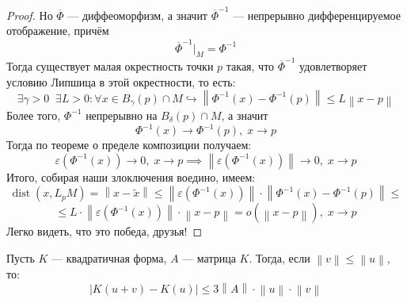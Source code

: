 \documentclass[11pt]{article}
\DeclareMathOperator{\dist}{dist}
\begin{document}
\begin{proof}
    Но $\overline{\Phi}$ --- диффеоморфизм, а значит $\overline{\Phi}^{-1}$ --- непрерывно дифференцируемое отображение, причём 
    \[\overline{\Phi}^{-1} \Big|_{M} = \Phi^{-1}\]
    Тогда существует малая окрестность точки $p$ такая, что $\overline{\Phi}^{-1}$ удовлетворяет условию Липшица в этой окрестности, то есть:
    \[\exists \gamma > 0 \; \; \exists L > 0: \forall x \in B_{\gamma} (p) \cap M \hookrightarrow \left\lVert \Phi^{-1} (x) - \Phi^{-1} (p) \right\rVert \leq L \left\lVert x - p \right\rVert \]
    Более того, $\Phi^{-1}$ непрерывно на $B_{\delta} (p) \cap M$, а значит 
    \[\Phi^{-1} (x) \to \Phi^{-1} (p), \; x \to p\]
    Тогда по теореме о пределе композиции получаем:
    \[\varepsilon (\Phi^{-1} (x)) \to 0, \; x \to p \implies \left\lVert \varepsilon (\Phi^{-1} (x)) \right\rVert \to 0, \; x \to p\]
    Итого, собирая наши злоключения воедино, имеем:
    \[\dist (x, L_p M) = \left\lVert x - \widetilde{x} \right\rVert \leq \left\lVert \varepsilon(\Phi^{-1} (x)) \right\rVert \cdot \left\lVert \Phi^{-1} (x) - \Phi^{-1} (p) \right\rVert \leq\]
    \[\leq L \cdot \left\lVert \varepsilon(\Phi^{-1} (x)) \right\rVert \cdot \left\lVert x - p \right\rVert = o \left(\left\lVert x - p \right\rVert \right), \; x \to p\]
    Легко видеть, что это победа, друзья!
\end{proof}

\begin{lemma} \label{lemma:1.3}
    Пусть $K$ --- квадратичная форма, $A$ --- матрица $K$. Тогда, если $\left\lVert v \right\rVert \leq \left\lVert u \right\rVert$, то:
    \[\left\lvert K(u + v) - K(u) \right\rvert \leq 3\left\lVert A \right\rVert \cdot \left\lVert u \right\rVert \cdot \left\lVert v \right\rVert\]
\end{lemma}
\end{document}
